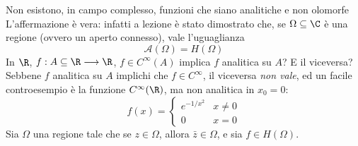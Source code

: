     Non esistono, in campo complesso, funzioni che siano analitiche e non olomorfe
    L'affermazione è vera: infatti a lezione è stato dimostrato che, se $ \Omega \subseteq \C $ è una regione (ovvero un aperto connesso), vale l'uguaglianza \[
        \mathcal{A}(\Omega) = H(\Omega)
    \]
    In $ \R $, $ f: A \subseteq \R \longrightarrow \R $, $ f \in C^{ \infty}(A) $ implica $ f $ analitica su $ A $? E il viceversa?
    Sebbene $ f $ analitica su $ A $ implichi che $ f \in C^{ \infty}$, il viceversa \emph{non vale}, ed un facile controesempio è la funzione $ C^{\infty} (\R) $, ma non analitica in $ x_0=0 $: \[
        f(x)=\begin{cases}
            e^{-1/x^{2}} & x\neq 0 \\ 
            0 & x=0
        \end{cases}
    \]
    Sia $\Omega$ una regione tale che se $z \in \Omega$, allora $\bar{z} \in \Omega$, e sia $f \in H(\Omega)$.
    
